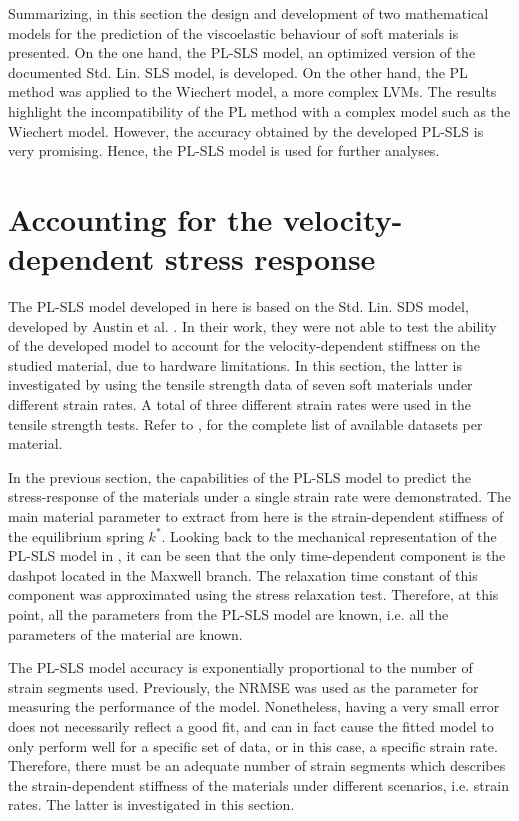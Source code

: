 Summarizing, in this section the design and development of two mathematical models for the prediction of the viscoelastic behaviour of soft materials is presented. On the one hand, the PL-SLS model, an optimized version of the documented Std. Lin. SLS model, is developed. On the other hand, the PL method was applied to the Wiechert model, a more complex LVMs. The results highlight the incompatibility of the PL method with a complex model such as the Wiechert model. However, the accuracy obtained by the developed PL-SLS is very promising. Hence, the PL-SLS model is used for further analyses.

\section{Accounting for the velocity-dependent stress response}

The PL-SLS model developed in here is based on the Std. Lin. SDS model, developed by Austin et al. \cite{austin2015control}. In their work, they were not able to test the ability of the developed model to account for the velocity-dependent stiffness on the studied material, due to hardware limitations. In this section, the latter is investigated by using the tensile strength data of seven soft materials under different strain rates. A total of three different strain rates were used in the tensile strength tests. Refer to , for the complete list of available datasets per material.

In the previous section, the capabilities of the PL-SLS model to predict the stress-response of the materials under a single strain rate were demonstrated. The main material parameter to extract from here is the strain-dependent stiffness of the equilibrium spring $k^*$. Looking back to the mechanical representation of the PL-SLS model in , it can be seen that the only time-dependent component is the dashpot located in the Maxwell branch. The relaxation time constant of this component was approximated using the stress relaxation test. Therefore, at this point, all the parameters from the PL-SLS model are known, i.e. all the parameters of the material are known.  

The PL-SLS model accuracy is exponentially proportional to the number of strain segments used. Previously, the NRMSE was used as the parameter for measuring the performance of the model. Nonetheless, having a very small error does not necessarily reflect a good fit, and can in fact cause the fitted model to only perform well for a specific set of data, or in this case, a specific strain rate. Therefore, there must be an adequate number of strain segments which describes the strain-dependent stiffness of the materials under different scenarios, i.e. strain rates. The latter is investigated in this section.


